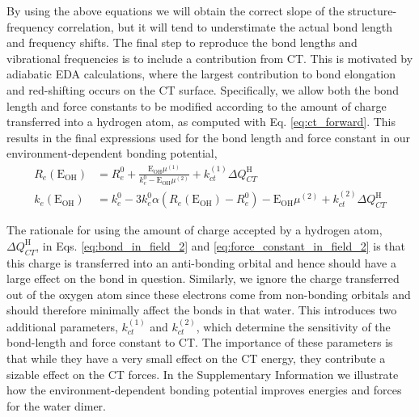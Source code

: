 \documentclass[journal=jctcce,manuscript=article]{achemso}
\begin{document}
By using the above equations we will obtain the correct slope of the structure-frequency correlation, but it will tend to understimate the actual bond length and frequency shifts. The final step to reproduce the bond lengths and vibrational frequencies is to include a contribution from CT. This is motivated by adiabatic EDA calculations, where the largest contribution to bond elongation and red-shifting occurs on the CT surface.\cite{mao2017energy} Specifically, we allow both the bond length and force constants to be modified according to the amount of charge transferred into a hydrogen atom, as computed with Eq. \ref{eq:ct_forward}. This results in the final expressions used for the bond length and force constant in our environment-dependent bonding potential,
\begin{align}
  \label{eq:bond_in_field_2}
  R_e(\mathrm{E_{OH}})&=R_e^0+ \frac{\mathrm{E_{OH}}\mu^{(1)}}{k_e^0-\mathrm{E_{OH}}\mu^{(2)}} + k_{ct}^{(1)}\Delta Q_{CT}^{\mathrm{H}} \\
  \label{eq:force_constant_in_field_2}
  k_e(\mathrm{E_{OH}})&=k_e^0-3k_e^0\alpha\left(R_e(\mathrm{E_{OH}})-R_e^0\right)-\mathrm{E_{OH}}\mu^{(2)}+k_{ct}^{(2)}\Delta Q_{CT}^{\mathrm{H}}
\end{align}

The rationale for using the amount of charge accepted by a hydrogen atom, $\Delta Q_{CT}^{\mathrm{H}}$, in Eqs. \ref{eq:bond_in_field_2} and \ref{eq:force_constant_in_field_2} is that this charge is transferred into an anti-bonding orbital and hence should have a large effect on the  bond in question. Similarly, we ignore the charge transferred out of the oxygen atom since these electrons come from non-bonding orbitals and should therefore minimally affect the  bonds in that water. This introduces two additional parameters, $k_{ct}^{(1)}$ and $k_{ct}^{(2)}$, which determine the sensitivity of the bond-length and force constant to CT. The importance of these parameters is that while they have a very small effect on the CT energy, they contribute a sizable effect on the CT forces. In the Supplementary Information we illustrate how the environment-dependent bonding potential improves energies and forces for the water dimer. 
\end{document}
